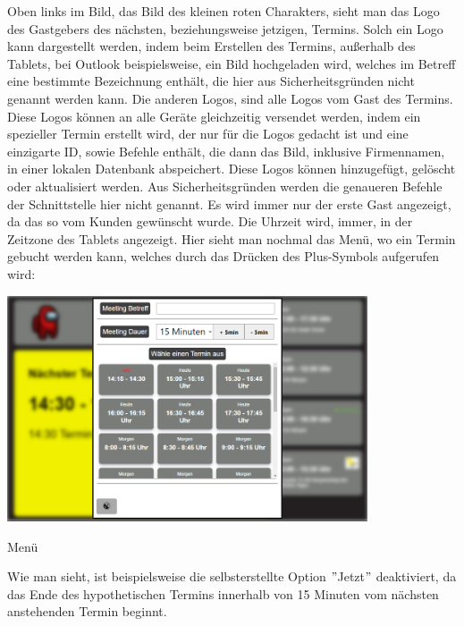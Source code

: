 \raggedright
\newline
Oben links im Bild, das Bild des kleinen roten Charakters, sieht man das Logo des Gastgebers des nächsten, beziehungsweise jetzigen, Termins.
Solch ein Logo kann dargestellt werden, indem beim Erstellen des Termins, außerhalb des Tablets, bei Outlook beispielsweise, ein Bild hochgeladen wird, welches im Betreff eine bestimmte Bezeichnung enthält, die hier aus Sicherheitsgründen nicht genannt werden kann.
\newline
Die anderen Logos, sind alle Logos vom Gast des Termins.
Diese Logos können an alle Geräte gleichzeitig versendet werden, indem ein spezieller Termin erstellt wird, der nur für die Logos gedacht ist und eine einzigarte ID, sowie Befehle enthält, die dann das Bild, inklusive Firmennamen, in einer lokalen Datenbank abspeichert.
Diese Logos können hinzugefügt, gelöscht oder aktualisiert werden.
Aus Sicherheitsgründen werden die genaueren Befehle der Schnittstelle hier nicht genannt.
\newline
Es wird immer nur der erste Gast angezeigt, da das so vom Kunden gewünscht wurde.
\newline
Die Uhrzeit wird, immer, in der Zeitzone des Tablets angezeigt.
\newline
\newline
Hier sieht man nochmal das Menü, wo ein Termin gebucht werden kann, welches durch das Drücken des Plus-Symbols aufgerufen wird:
\par\vspace{1cm}
    \centering
    \includegraphics[width=0.8\textwidth]{Bilder/Ergebnis_TerminErstellen_Menue}
    \caption{Menü}
    \label{fig:Menue}
\par\vspace{1cm}
\raggedright
Wie man sieht, ist beispielsweise die selbsterstellte Option \("\)Jetzt\("\) deaktiviert, da das Ende des hypothetischen Termins innerhalb von 15 Minuten vom nächsten anstehenden Termin beginnt.
